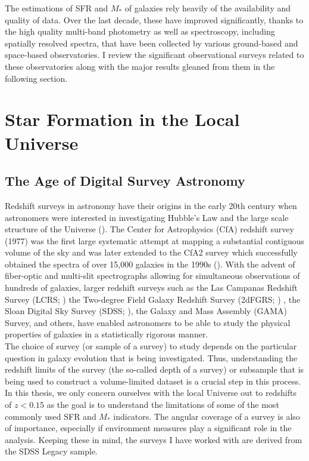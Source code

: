 The estimations of SFR and $M_{*}$ of galaxies rely heavily of the
availability and quality of data. Over the last decade, these have
improved significantly, thanks to the high quality multi-band
photometry as well as spectroscopy, including spatially resolved
spectra, that have been collected by various ground-based and
space-based observatories. I review the significant observational
surveys related to these observatories along with the major results
gleaned from them in the following section.\\

\section{Star Formation in the Local Universe}

\subsection{The Age of Digital Survey Astronomy}

Redshift surveys in astronomy have their origins in the early 20th
century when astronomers were interested in investigating Hubble's Law
and the large scale structure of the Universe
(\citealt{hubble31a}). The Center for Astrophysics (CfA) redshift
survey (1977) was the first large systematic attempt at mapping a
substantial contiguous volume of the sky and was later extended to the
CfA2 survey which successfully obtained the spectra of over 15,000
galaxies in the 1990s (\citealt{huchra95a}). With the advent of
fiber-optic and multi-slit spectrographs allowing for simultaneous
observations of hundreds of galaxies, larger redshift surveys such as
the Las Campanas Redshift Survey (LCRS; \citealt{shectman96a}) the
Two-degree Field Galaxy Redshift Survey (2dFGRS; \citealt{colless01a})
, the Sloan Digital Sky Survey (SDSS; \citealt{2000AJ....120.1579Y,
  eisenstein11a, blanton17a}), the Galaxy and Mass Assembly (GAMA)
Survey, and others, have enabled astronomers to be able to study the
physical properties of galaxies in a statistically rigorous manner.\\

The choice of survey (or sample of a survey) to study depends on the
particular question in galaxy evolution that is being
investigated. Thus, understanding the redshift limits of the survey
(the so-called depth of a survey) or subsample that is being used to
construct a volume-limited dataset is a crucial step in this
process. In this thesis, we only concern ourselves with the local
Universe out to redshifts of $z < 0.15$ as the goal is to understand
the limitations of some of the most commonly used SFR and $M_{*}$
indicators. The angular coverage of a survey is also of importance,
especially if environment measures play a significant role in the
analysis. Keeping these in mind, the surveys I have worked with are
derived from the SDSS Legacy sample.\\

